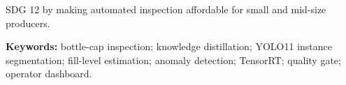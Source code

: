 \documentclass[12pt,a4paper]{report}
\theoremstyle{definition}
\theoremstyle{remark}
\begin{document}
SDG 12 by making automated inspection affordable for small and mid-size producers.

\vspace{1em}
\noindent\textbf{Keywords:} bottle-cap inspection; knowledge distillation; YOLO11 instance segmentation; fill-level estimation; anomaly detection; TensorRT; quality gate; operator dashboard.

\newpage
\pagestyle{chapterstyle}










\end{document}

